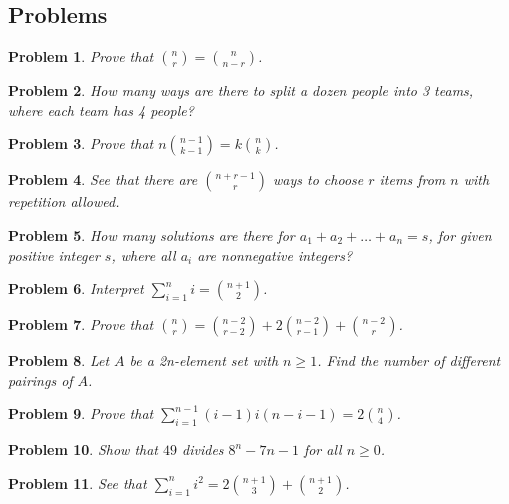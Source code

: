 \documentclass[11pt,a5paper]{article}
\newtheorem{problem}{Problem}
\begin{document}
\subsection*{Problems}

\begin{problem}
Prove that ${n \choose r} = {n \choose n - r}$.
\end{problem}

\begin{problem}
How many ways are there to split a dozen people into 3 teams, where each team has 4 people?
\end{problem}

\begin{problem}
Prove that $n{n-1 \choose k-1}= k{n \choose k}$.
\end{problem}

\begin{problem}
See that there are ${n+r-1 \choose r}$ ways to choose $r$ items from $n$ with repetition allowed.
\end{problem}

\begin{problem}
How many solutions are there for $a_1 + a_2 + \dots + a_n = s$, for given positive integer $s$, where all $a_i$ are nonnegative integers?
\end{problem}

\begin{problem}
Interpret $\sum_{i=1}^{n} i = {n+1 \choose 2}$.
\end{problem}

\begin{problem}
Prove that ${n \choose r} = {n - 2 \choose r - 2} + 2{n - 2 \choose r - 1} + {n - 2 \choose r}$.
\end{problem}

\begin{problem}
Let $A$ be a \textit{2n}-element set with $n \ge 1$. Find the number of different pairings of $A$.
\end{problem}

\begin{problem}
Prove that $\sum_{i=1}^{n-1} (i - 1)i(n-i-1) = 2{n \choose 4}$.
\end{problem}

\begin{problem}
Show that $49$ divides $8^n - 7n - 1$ for all $n \ge 0$.
\end{problem}

\begin{problem}
See that $\sum_{i=1}^n i^2 = 2 {n+1 \choose 3} + {n+1\choose 2}$.
\end{problem}
\end{document}
